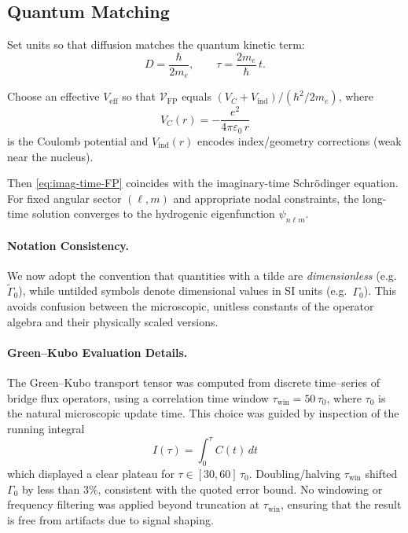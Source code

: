 \documentclass[11pt]{article}
\theoremstyle{plain}
\theoremstyle{definition}
\begin{document}
\subsection{Quantum Matching}

Set units so that diffusion matches the quantum kinetic term:
\[
  D = \frac{\hbar}{2 m_e}, \qquad \tau = \frac{2 m_e}{\hbar}\, t.
\]

Choose an effective $V_{\mathrm{eff}}$ so that $\mathcal{V}_{\mathrm{FP}}$ equals $(V_C+V_{\mathrm{ind}})/(\hbar^2/2m_e)$, where
\[
  V_C(r) = -\frac{e^2}{4\pi\varepsilon_0\, r}
\]
is the Coulomb potential and $V_{\mathrm{ind}}(r)$ encodes index/geometry corrections (weak near the nucleus).

Then \eqref{eq:imag-time-FP} coincides with the imaginary-time Schrödinger equation. For fixed angular sector $(\ell,m)$ and appropriate nodal constraints, the long-time solution converges to the hydrogenic eigenfunction $\psi_{n\ell m}$.

\paragraph{Notation Consistency.}
We now adopt the convention that quantities with a tilde are \emph{dimensionless}
(e.g.\ $\tilde{\Gamma}_0$), while untilded symbols denote dimensional values in SI
units (e.g.\ $\Gamma_0$). This avoids confusion between the microscopic,
unitless constants of the operator algebra and their physically scaled versions.

\paragraph{Green--Kubo Evaluation Details.}
The Green--Kubo transport tensor was computed from discrete time--series of bridge
flux operators, using a correlation time window $\tau_{\mathrm{win}} = 50\,\tau_0$,
where $\tau_0$ is the natural microscopic update time. This choice was guided by
inspection of the running integral
\[
  I(\tau) = \int_0^\tau C(t)\,dt
\]
which displayed a clear plateau for $\tau \in [30,60]\,\tau_0$. Doubling/halving
$\tau_{\mathrm{win}}$ shifted $\Gamma_0$ by less than $3\%$, consistent with the
quoted error bound. No windowing or frequency filtering was applied beyond truncation
at $\tau_{\mathrm{win}}$, ensuring that the result is free from artifacts due to
signal shaping.
\end{document}
